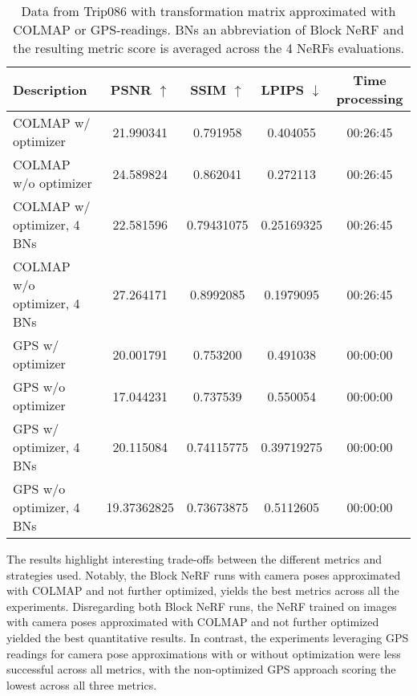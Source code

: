 \begin{table}[ht]
\centering
\setlength{\tabcolsep}{6pt}
\renewcommand{\arraystretch}{1.5}
\begin{tabular}{l | C{2.2} C{1.3} C{1.3} c}
\hline
\textbf{Description} & \textbf{PSNR $\uparrow$} & \textbf{SSIM $\uparrow$} & \textbf{LPIPS $\downarrow$} & \textbf{Time processing} \\
\hline
COLMAP w/ optimizer           & 21.990341 & 0.791958 & 0.404055         & 00:26:45 \\
COLMAP w/o optimizer          & 24.589824 & 0.862041 & 0.272113         & 00:26:45 \\
COLMAP w/ optimizer, 4 BNs    & 22.581596	& 0.79431075 & 0.25169325   & 00:26:45 \\
COLMAP w/o optimizer, 4 BNs   & 27.264171 & 0.8992085 & 0.1979095       & 00:26:45 \\
GPS w/ optimizer              & 20.001791 & 0.753200 & 0.491038         & 00:00:00 \\
GPS w/o optimizer             & 17.044231 & 0.737539 & 0.550054         & 00:00:00 \\
GPS w/ optimizer, 4 BNs       & 20.115084 & 0.74115775 & 0.39719275     & 00:00:00 \\
GPS w/o optimizer, 4 BNs      & 19.37362825 & 0.73673875 & 0.5112605    & 00:00:00 \\
\hline
\end{tabular}
\caption{Data from Trip086 with transformation matrix approximated with COLMAP or GPS-readings. BNs an abbreviation of Block NeRF and the resulting metric score is averaged across the 4 NeRFs evaluations.}
\label{tab:trip086-results}
\end{table}







The results highlight interesting trade-offs between the different metrics and strategies used. Notably, the Block NeRF runs with camera poses approximated with COLMAP and not further optimized, yields the best metrics across all the experiments. Disregarding both Block NeRF runs, the NeRF trained on images with camera poses approximated with COLMAP and not further optimized yielded the best quantitative results. In contrast, the experiments leveraging GPS readings for camera pose approximations with or without optimization were less successful across all metrics, with the non-optimized GPS approach scoring the lowest across all three metrics.


